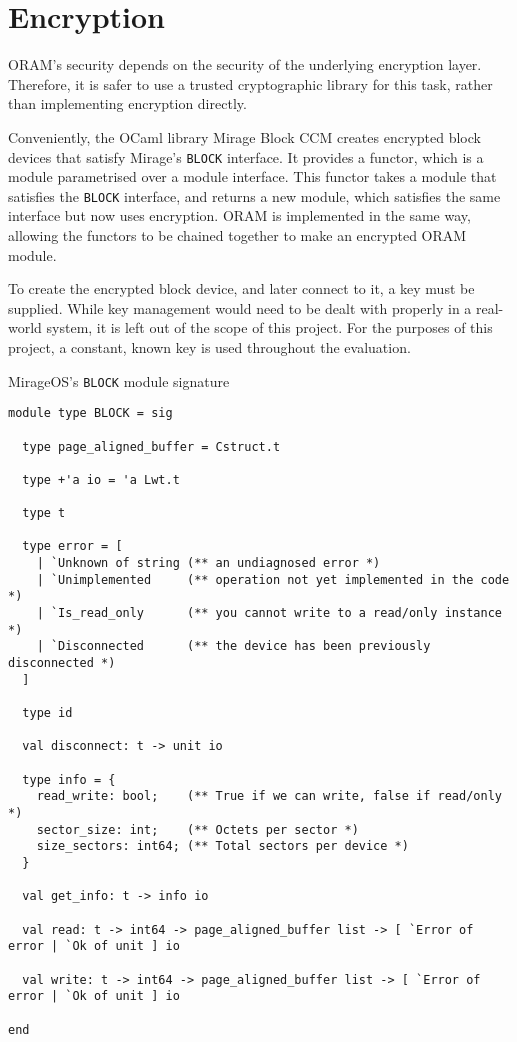 \documentclass[12pt,a4paper,twoside,openright]{report}
\begin{document}
\section{Encryption}
\label{sec:encryption}

ORAM's security depends on the security of the underlying encryption layer. Therefore, it is safer to use a trusted cryptographic library for this task, rather than implementing encryption directly.

Conveniently, the OCaml library Mirage Block CCM creates encrypted block devices that satisfy Mirage's \texttt{BLOCK} interface. It provides a functor, which is a module parametrised over a module interface. This functor takes a module that satisfies the \texttt{BLOCK} interface, and returns a new module, which satisfies the same interface but now uses encryption. ORAM is implemented in the same way, allowing the functors to be chained together to make an encrypted ORAM module.

To create the encrypted block device, and later connect to it, a key must be supplied. While key management would need to be dealt with properly in a real-world system, it is left out of the scope of this project. For the purposes of this project, a constant, known key is used throughout the evaluation.

\begin{listing}[t]
\caption{MirageOS's \texttt{BLOCK} module signature}
\label{lst:blocksig}
\vskip 10pt
\begin{verbatim}
module type BLOCK = sig

  type page_aligned_buffer = Cstruct.t

  type +'a io = 'a Lwt.t

  type t

  type error = [
    | `Unknown of string (** an undiagnosed error *)
    | `Unimplemented     (** operation not yet implemented in the code *)
    | `Is_read_only      (** you cannot write to a read/only instance *)
    | `Disconnected      (** the device has been previously disconnected *)
  ]

  type id

  val disconnect: t -> unit io

  type info = {
    read_write: bool;    (** True if we can write, false if read/only *)
    sector_size: int;    (** Octets per sector *)
    size_sectors: int64; (** Total sectors per device *)
  }

  val get_info: t -> info io

  val read: t -> int64 -> page_aligned_buffer list -> [ `Error of error | `Ok of unit ] io

  val write: t -> int64 -> page_aligned_buffer list -> [ `Error of error | `Ok of unit ] io

end
\end{verbatim}
\end{listing}
\end{document}
